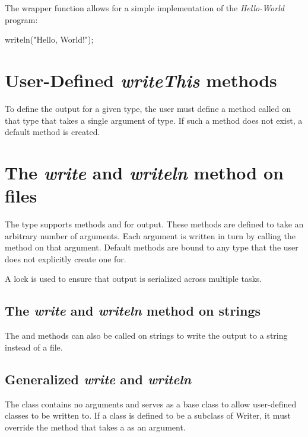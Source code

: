 \begin{example}
The  wrapper function allows for a simple implementation
of the {\em Hello-World} program:
\begin{chapel}
writeln("Hello, World!");
\end{chapel}
\end{example}

\section{User-Defined {\em writeThis} methods}

To define the output for a given type, the user must define a method
called  on that type that takes a single argument of
 type.  If such a method does not exist, a default method is
created.

\section{The {\em write} and {\em writeln} method on files}
\label{filewrite}

The  type supports methods  and 
for output.  These methods are defined to take an arbitrary number of
arguments.  Each argument is written in turn by calling
the  method on that argument.
Default  methods are bound to any type that the user
does not explicitly create one for.

A lock is used to ensure that output is serialized across multiple
tasks.

\subsection{The {\em write} and {\em writeln} method on strings}
\label{stringwrite}

The  and  methods can also be called on
strings to write the output to a string instead of a file.

\subsection{Generalized {\em write} and {\em writeln}}
\label{writer}

The  class contains no arguments and serves as a base
class to allow user-defined classes to be written to.  If a class is
defined to be a subclass of Writer, it must override
the  method that takes a  as an argument.

